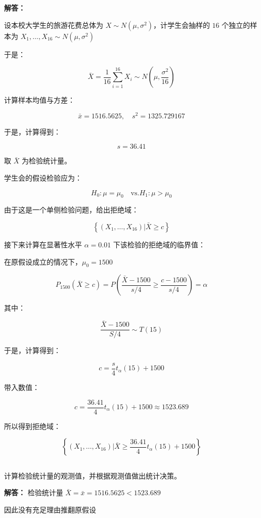 \documentclass[12pt,a4paper]{article}
\begin{document}
\begin{answerbox}
\textbf{解答：}

设本校大学生的旅游花费总体为 $X \sim N\left(\mu, \sigma^2\right)$，计学生会抽样的 $16$ 个独立的样本为 $X_1, \ldots, X_{16} \sim N\left(\mu, \sigma^2\right)$

于是：

$$
\bar{X} = \frac{1}{16} \sum_{i=1}^{16} X_i \sim N\left(\mu, \frac{\sigma^2}{16}\right)
$$

计算样本均值与方差：

$$
\bar{x} = 1516.5625, \quad s^2 = 1325.729167
$$

于是，计算得到：

$$
s = 36.41
$$

取 $\bar{X}$ 为检验统计量。

学生会的假设检验应为：

$$
H_0: \mu = \mu_0 \quad \text{vs.} H_1: \mu >\mu_0
$$

由于这是一个单侧检验问题，给出拒绝域：

$$
\left\{(X_1, \ldots, X_{16}) | \bar{X} \geq c\right\}
$$

接下来计算在显著性水平 $\alpha=0.01$ 下该检验的拒绝域的临界值：

在原假设成立的情况下，$\mu_0 = 1500$

$$
P_{1500}\left(\bar{X} \geq c\right) = P\left(\frac{\bar{X}-1500}{s/4} \geq \frac{c-1500}{s/4}\right) = \alpha
$$

其中：

$$
\frac{\bar{X}-1500}{S/4} \sim T(15)
$$

于是，计算得到：

$$
c = \frac{s}{4}t_\alpha(15) + 1500
$$

带入数值：

$$
c = \frac{36.41}{4}t_\alpha(15) + 1500 \approx 1523.689
$$

所以得到拒绝域：

$$
\left\{(X_1, \ldots, X_{16}) | \bar{X} \geq \frac{36.41}{4}t_\alpha(15) + 1500\right\}
$$
\end{answerbox}


\subsection{}

计算检验统计量的观测值，并根据观测值做出统计决策。

\begin{answerbox}
\textbf{解答：}
检验统计量 $\bar{X} = \bar{x} = 1516.5625 < 1523.689$

因此没有充足理由推翻原假设
\end{answerbox}
\end{document}
